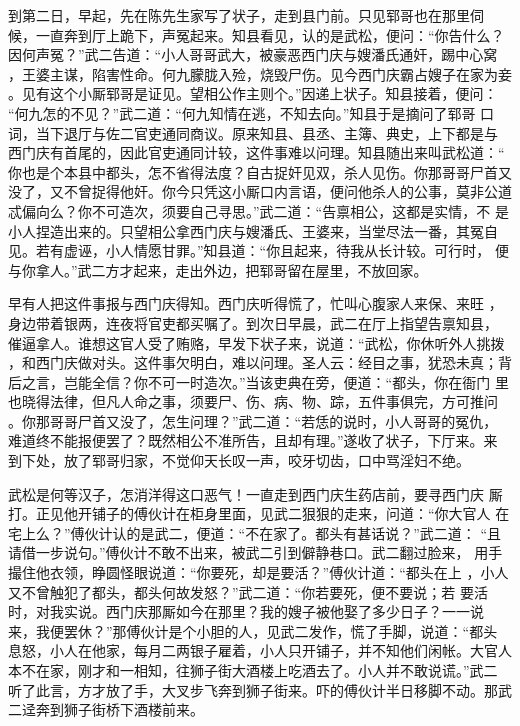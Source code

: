 到第二日，早起，先在陈先生家写了状子，走到县门前。只见郓哥也在那里伺
候，一直奔到厅上跪下，声冤起来。知县看见，认的是武松，便问：“你告什么？
因何声冤？”武二告道：“小人哥哥武大，被豪恶西门庆与嫂潘氏通奸，踢中心窝
，王婆主谋，陷害性命。何九朦胧入殓，烧毁尸伤。见今西门庆霸占嫂子在家为妾
。见有这个小厮郓哥是证见。望相公作主则个。”因递上状子。知县接着，便问：
“何九怎的不见？”武二道：“何九知情在逃，不知去向。”知县于是摘问了郓哥
口词，当下退厅与佐二官吏通同商议。原来知县、县丞、主簿、典史，上下都是与
西门庆有首尾的，因此官吏通同计较，这件事难以问理。知县随出来叫武松道：“
你也是个本县中都头，怎不省得法度？自古捉奸见双，杀人见伤。你那哥哥尸首又
没了，又不曾捉得他奸。你今只凭这小厮口内言语，便问他杀人的公事，莫非公道
忒偏向么？你不可造次，须要自己寻思。”武二道：“告禀相公，这都是实情，不
是小人捏造出来的。只望相公拿西门庆与嫂潘氏、王婆来，当堂尽法一番，其冤自
见。若有虚诬，小人情愿甘罪。”知县道：“你且起来，待我从长计较。可行时，
便与你拿人。”武二方才起来，走出外边，把郓哥留在屋里，不放回家。

早有人把这件事报与西门庆得知。西门庆听得慌了，忙叫心腹家人来保、来旺
，身边带着银两，连夜将官吏都买嘱了。到次日早晨，武二在厅上指望告禀知县，
催逼拿人。谁想这官人受了贿赂，早发下状子来，说道：“武松，你休听外人挑拨
，和西门庆做对头。这件事欠明白，难以问理。圣人云：经目之事，犹恐未真；背
后之言，岂能全信？你不可一时造次。”当该吏典在旁，便道：“都头，你在衙门
里也晓得法律，但凡人命之事，须要尸、伤、病、物、踪，五件事俱完，方可推问
。你那哥哥尸首又没了，怎生问理？”武二道：“若恁的说时，小人哥哥的冤仇，
难道终不能报便罢了？既然相公不准所告，且却有理。”遂收了状子，下厅来。来
到下处，放了郓哥归家，不觉仰天长叹一声，咬牙切齿，口中骂淫妇不绝。

武松是何等汉子，怎消洋得这口恶气！一直走到西门庆生药店前，要寻西门庆
厮打。正见他开铺子的傅伙计在柜身里面，见武二狠狠的走来，问道：“你大官人
在宅上么？”傅伙计认的是武二，便道：“不在家了。都头有甚话说？”武二道：
“且请借一步说句。”傅伙计不敢不出来，被武二引到僻静巷口。武二翻过脸来，
用手撮住他衣领，睁圆怪眼说道：“你要死，却是要活？”傅伙计道：“都头在上
，小人又不曾触犯了都头，都头何故发怒？”武二道：“你若要死，便不要说；若
要活时，对我实说。西门庆那厮如今在那里？我的嫂子被他娶了多少日子？一一说
来，我便罢休？”那傅伙计是个小胆的人，见武二发作，慌了手脚，说道：“都头
息怒，小人在他家，每月二两银子雇着，小人只开铺子，并不知他们闲帐。大官人
本不在家，刚才和一相知，往狮子街大酒楼上吃酒去了。小人并不敢说谎。”武二
听了此言，方才放了手，大叉步飞奔到狮子街来。吓的傅伙计半日移脚不动。那武
二迳奔到狮子街桥下酒楼前来。

